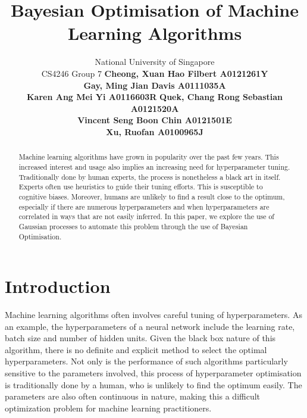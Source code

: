 \documentclass[letterpaper]{article}
\begin{document}
%
\title{Bayesian Optimisation of Machine Learning Algorithms}
\author{
National University of Singapore \\
CS4246 Group 7 \AND
\normalsize\normalfont\textbf{Cheong, Xuan Hao Filbert A0121261Y} \\
\normalsize\normalfont\textbf{Gay, Ming Jian Davis A0111035A} \\
\normalsize\normalfont\textbf{Karen Ang Mei Yi A0116603R} \And
\normalsize\normalfont\textbf{Quek, Chang Rong Sebastian A0121520A} \\
\normalsize\normalfont\textbf{Vincent Seng Boon Chin A0121501E} \\
\normalsize\normalfont\textbf{Xu, Ruofan A0100965J}
}

\maketitle
\begin{abstract}
Machine learning algorithms have grown in popularity over the past few years.
This increased interest and usage also implies an increasing need for
hyperparameter tuning. Traditionally done by human experts, the process is
nonetheless a black art in itself. Experts often use heuristics to guide their
tuning efforts. This is susceptible to cognitive biases. Moreover, humans
are unlikely to find a result close to the optimum, especially if there are
numerous hyperparameters and when hyperparameters are correlated in ways that are
not easily inferred. In this paper, we explore the use of Gaussian processes to
automate this problem through the use of Bayesian Optimisation.
\end{abstract}

\section{Introduction}
\noindent Machine learning algorithms often involves careful tuning of hyperparameters.
As an example, the hyperparameters of a neural network include the learning rate,
batch size and number of hidden units. Given the black box nature of this algorithm,
there is no definite and explicit method to select the optimal hyperparameters.
Not only is the performance of such algorithms particularly sensitive to the
parameters involved, this process of hyperparameter optimisation is traditionally
done by a human, who is unlikely to find the optimum easily. The parameters are
also often continuous in nature, making this a difficult optimization problem for
machine learning practitioners.
\end{document}
